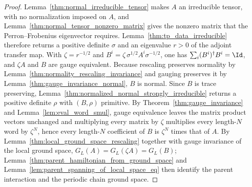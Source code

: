 \begin{proof}
    \leanok
    Lemma~\ref{thm:normal_irreducible_tensor} makes $A$ an irreducible
    tensor, with no normalization imposed on $A$, and
    Lemma~\ref{thm:normal_tensor_nonzero_matrix} gives the nonzero matrix
    that the Perron--Frobenius eigenvector requires.
    Lemma~\ref{thm:tp_data_irreducible} therefore returns a
    positive definite $\sigma$ and an eigenvalue $r>0$ of the adjoint transfer
    map.  With $\zeta=r^{-1/2}$ and $B^i=\zeta\,\sigma^{1/2}A^i\sigma^{-1/2}$,
    one has $\sum_i(B^i)^\dagger B^i=\Id$, and $\zeta A$ and $B$ are gauge
    equivalent.  Because rescaling preserves normality by
    Lemma~\ref{thm:normality_rescaling_invariance} and gauging preserves it
    by Lemma~\ref{thm:gauge_invariance_normal}, $B$ is normal.  Since $B$
    is trace preserving,
    Lemma~\ref{thm:normalized_normal_strongly_irreducible} returns a positive
    definite $\rho$ with $(B,\rho)$ primitive.  By
    Theorem~\ref{thm:gauge_invariance} and Lemma~\ref{lem:eval_word_smul},
    gauge equivalence leaves the matrix product vectors unchanged and
    multiplying every matrix by $\zeta$ multiplies every length-$N$ word by
    $\zeta^{N}$, hence every length-$N$ coefficient of $B$ is $\zeta^{N}$ times
    that of $A$.  By Lemma~\ref{thm:local_ground_space_rescaling} together
    with gauge invariance of the local ground space, $G_L(A)=G_L(\zeta A)=G_L(B)$;
    Lemma~\ref{thm:parent_hamiltonian_from_ground_space} and
    Lemma~\ref{lem:parent_spanning_of_local_space_eq} then identify the parent
    interaction and the periodic chain ground space.
\end{proof}

